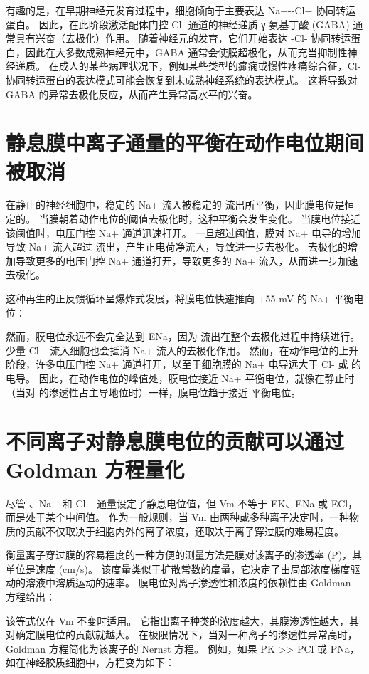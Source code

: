 有趣的是，在早期神经元发育过程中，细胞倾向于主要表达 Na+--Cl− 协同转运蛋白。 
因此，在此阶段激活配体门控 Cl- 通道的神经递质 γ-氨基丁酸 (GABA) 通常具有兴奋（去极化）作用。 
随着神经元的发育，它们开始表达 -Cl- 协同转运蛋白，因此在大多数成熟神经元中，GABA 通常会使膜超极化，从而充当抑制性神经递质。 
在成人的某些病理状况下，例如某些类型的癫痫或慢性疼痛综合征，Cl- 协同转运蛋白的表达模式可能会恢复到未成熟神经系统的表达模式。 
这将导致对 GABA 的异常去极化反应，从而产生异常高水平的兴奋。



\section{静息膜中离子通量的平衡在动作电位期间被取消}

在静止的神经细胞中，稳定的 Na+ 流入被稳定的  流出所平衡，因此膜电位是恒定的。 
当膜朝着动作电位的阈值去极化时，这种平衡会发生变化。 
当膜电位接近该阈值时，电压门控 Na+ 通道迅速打开。 
一旦超过阈值，膜对 Na+ 电导的增加导致 Na+ 流入超过  流出，产生正电荷净流入，导致进一步去极化。 
去极化的增加导致更多的电压门控 Na+ 通道打开，导致更多的 Na+ 流入，从而进一步加速去极化。


这种再生的正反馈循环呈爆炸式发展，将膜电位快速推向 +55 mV 的 Na+ 平衡电位：

然而，膜电位永远不会完全达到 ENa，因为  流出在整个去极化过程中持续进行。 
少量 Cl− 流入细胞也会抵消 Na+ 流入的去极化作用。 
然而，在动作电位的上升阶段，许多电压门控 Na+ 通道打开，以至于细胞膜的 Na+ 电导远大于 Cl- 或  的电导。 
因此，在动作电位的峰值处，膜电位接近 Na+ 平衡电位，就像在静止时（当对  的渗透性占主导地位时）一样，膜电位趋于接近  平衡电位。


\section{不同离子对静息膜电位的贡献可以通过 Goldman 方程量化}
尽管 、Na+ 和 Cl− 通量设定了静息电位值，但 Vm 不等于 EK、ENa 或 ECl，而是处于某个中间值。 
作为一般规则，当 Vm 由两种或多种离子决定时，一种物质的贡献不仅取决于细胞内外的离子浓度，还取决于离子穿过膜的难易程度。


衡量离子穿过膜的容易程度的一种方便的测量方法是膜对该离子的渗透率 (P)，其单位是速度 (cm/s)。 
该度量类似于扩散常数的度量，它决定了由局部浓度梯度驱动的溶液中溶质运动的速率。 
膜电位对离子渗透性和浓度的依赖性由 Goldman 方程给出：


该等式仅在 Vm 不变时适用。 
它指出离子种类的浓度越大，其膜渗透性越大，其对确定膜电位的贡献就越大。 
在极限情况下，当对一种离子的渗透性异常高时，Goldman 方程简化为该离子的 Nernst 方程。 
例如，如果 PK >> PCl 或 PNa，如在神经胶质细胞中，方程变为如下：


